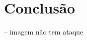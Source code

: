 \documentclass[conference]{IEEEtran}
\begin{document}

\section{Conclusão} %
\label{sec:conclusion}

-- imagem não tem ataque


% 


\end{document}
